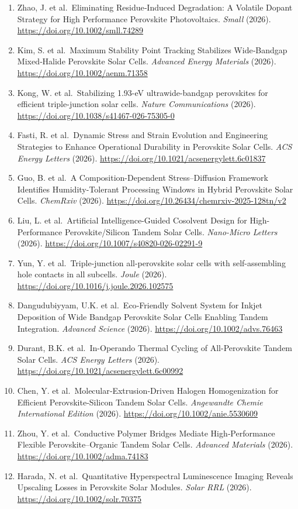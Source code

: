 \documentclass[
  11pt,
]{article}
\begin{document}
\begin{enumerate}
  Hole‐Transport‐Layer‐Free Perovskite Solar Cells via 2D/3D Interfacial
  Structural Configuration. \emph{Solar RRL} (2026).
  \url{https://doi.org/10.1002/solr.70447}
\item
  Zhao, J. et al.~Eliminating Residue‐Induced Degradation: A Volatile
  Dopant Strategy for High Performance Perovskite Photovoltaics.
  \emph{Small} (2026). \url{https://doi.org/10.1002/smll.74289}
\item
  Kim, S. et al.~Maximum Stability Point Tracking Stabilizes
  Wide‐Bandgap Mixed‐Halide Perovskite Solar Cells. \emph{Advanced
  Energy Materials} (2026). \url{https://doi.org/10.1002/aenm.71358}
\item
  Kong, W. et al.~Stabilizing 1.93-eV ultrawide-bandgap perovskites for
  efficient triple-junction solar cells. \emph{Nature Communications}
  (2026). \url{https://doi.org/10.1038/s41467-026-75305-0}
\item
  Fasti, R. et al.~Dynamic Stress and Strain Evolution and Engineering
  Strategies to Enhance Operational Durability in Perovskite Solar
  Cells. \emph{ACS Energy Letters} (2026).
  \url{https://doi.org/10.1021/acsenergylett.6c01837}
\item
  Guo, B. et al.~A Composition-Dependent Stress--Diffusion Framework
  Identifies Humidity-Tolerant Processing Windows in Hybrid Perovskite
  Solar Cells. \emph{ChemRxiv} (2026).
  \url{https://doi.org/10.26434/chemrxiv-2025-128tn/v2}
\item
  Liu, L. et al.~Artificial Intelligence-Guided Cosolvent Design for
  High-Performance Perovskite/Silicon Tandem Solar Cells.
  \emph{Nano-Micro Letters} (2026).
  \url{https://doi.org/10.1007/s40820-026-02291-9}
\item
  Yun, Y. et al.~Triple-junction all-perovskite solar cells with
  self-assembling hole contacts in all subcells. \emph{Joule} (2026).
  \url{https://doi.org/10.1016/j.joule.2026.102575}
\item
  Dangudubiyyam, U.K. et al.~Eco‐Friendly Solvent System for Inkjet
  Deposition of Wide Bandgap Perovskite Solar Cells Enabling Tandem
  Integration. \emph{Advanced Science} (2026).
  \url{https://doi.org/10.1002/advs.76463}
\item
  Durant, B.K. et al.~In-Operando Thermal Cycling of All-Perovskite
  Tandem Solar Cells. \emph{ACS Energy Letters} (2026).
  \url{https://doi.org/10.1021/acsenergylett.6c00992}
\item
  Chen, Y. et al.~Molecular‐Extrusion‐Driven Halogen Homogenization for
  Efficient Perovskite‐Silicon Tandem Solar Cells. \emph{Angewandte
  Chemie International Edition} (2026).
  \url{https://doi.org/10.1002/anie.5530609}
\item
  Zhou, Y. et al.~Conductive Polymer Bridges Mediate High‐Performance
  Flexible Perovskite--Organic Tandem Solar Cells. \emph{Advanced
  Materials} (2026). \url{https://doi.org/10.1002/adma.74183}
\item
  Harada, N. et al.~Quantitative Hyperspectral Luminescence Imaging
  Reveals Upscaling Losses in Perovskite Solar Modules. \emph{Solar RRL}
  (2026). \url{https://doi.org/10.1002/solr.70375}
\end{enumerate}
\end{document}
